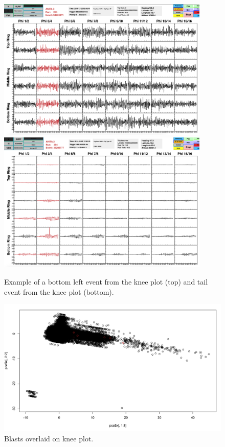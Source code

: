 \begin{figure}
\centering
\includegraphics[width=0.9\textwidth]{figures/bottom_left_ex.png}
\includegraphics[width=0.9\textwidth]{figures/tail_event_ex.png}
\caption{Example of a bottom left event from the knee plot (top) and tail event from the knee plot (bottom).}
\label{bottom_tail}
\end{figure}


\begin{figure}
\centering
\includegraphics[width=1.0\textwidth]{figures/kneePlotWithBlastsOverlaid.png}
\caption{Blasts overlaid on knee plot. }
\label{blasts_over}
\end{figure}


